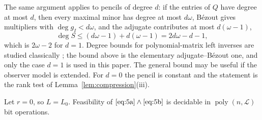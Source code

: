 \begin{remark}\label{rem:degree}
The same argument applies to pencils of degree $d$: if the entries of $Q$ have
degree at most $d$, then every maximal minor has degree at most $d\omega$,
B\'ezout gives multipliers with $\deg g_I<d\omega$, and the adjugate contributes
at most $d(\omega-1)$,
\begin{equation*}
\deg S\le(d\omega-1)+d(\omega-1)=2d\omega-d-1,
\end{equation*}
which is $2\omega-2$ for $d=1$. Degree bounds for polynomial-matrix left
inverses are studied classically \cite{fab90}; the bound above is the elementary
adjugate--B\'ezout one, and only the case $d=1$ is used in this paper. The
general bound may be useful if the observer model is extended. For $d=0$ the
pencil is constant and the statement is the rank test of
Lemma~\ref{lem:compression}(iii).
\end{remark}

\begin{prop}\label{prop:zero}
Let $r=0$, so $L=L_0$. Feasibility of $\eqref{eq:5a}\wedge\eqref{eq:5b}$ is
decidable in $\operatorname{poly}(n,\mathcal L)$ bit operations.
\end{prop}

